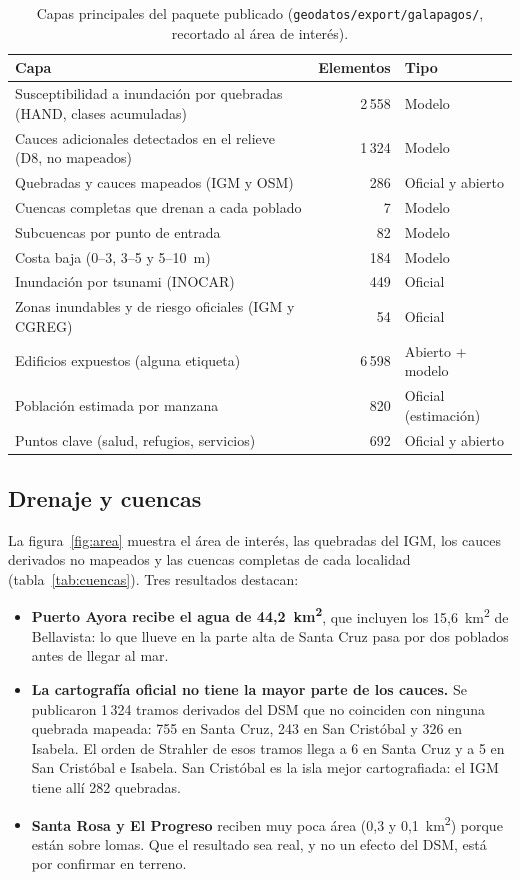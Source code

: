 \documentclass{sosg-informe}
\newcommand{\kmc}{km\textsuperscript{2}}
\begin{document}
\begin{table}[ht]
  \centering\small
  \caption{Capas principales del paquete publicado (\texttt{geodatos/export/galapagos/}, recortado al área de interés).}
  \label{tab:capas}
  \begin{tabularx}{\linewidth}{>{\raggedright\arraybackslash}Xrl}
    \toprule
    Capa & Elementos & Tipo \\
    \midrule
    Susceptibilidad a inundación por quebradas (HAND, clases acumuladas) & 2\,558 & Modelo \\
    Cauces adicionales detectados en el relieve (D8, no mapeados) & 1\,324 & Modelo \\
    Quebradas y cauces mapeados (IGM y OSM) & 286 & Oficial y abierto \\
    Cuencas completas que drenan a cada poblado & 7 & Modelo \\
    Subcuencas por punto de entrada & 82 & Modelo \\
    Costa baja (0--3, 3--5 y 5--10~m) & 184 & Modelo \\
    Inundación por tsunami (INOCAR) & 449 & Oficial \\
    Zonas inundables y de riesgo oficiales (IGM y CGREG) & 54 & Oficial \\
    Edificios expuestos (alguna etiqueta) & 6\,598 & Abierto + modelo \\
    Población estimada por manzana & 820 & Oficial (estimación) \\
    Puntos clave (salud, refugios, servicios) & 692 & Oficial y abierto \\
    \bottomrule
  \end{tabularx}
\end{table}

\subsection{Drenaje y cuencas}\label{sec:cuencas}
La figura~\ref{fig:area} muestra el área de interés, las quebradas del IGM, los cauces derivados no mapeados y las cuencas completas de cada localidad (tabla~\ref{tab:cuencas}). Tres resultados destacan:
\begin{itemize}
  \item \textbf{Puerto Ayora recibe el agua de 44,2~\kmc}, que incluyen los 15,6~\kmc{} de Bellavista: lo que llueve en la parte alta de Santa Cruz pasa por dos poblados antes de llegar al mar.
  \item \textbf{La cartografía oficial no tiene la mayor parte de los cauces.} Se publicaron 1\,324 tramos derivados del DSM que no coinciden con ninguna quebrada mapeada: 755 en Santa Cruz, 243 en San Cristóbal y 326 en Isabela. El orden de Strahler de esos tramos llega a 6 en Santa Cruz y a 5 en San Cristóbal e Isabela. San Cristóbal es la isla mejor cartografiada: el IGM tiene allí 282 quebradas.
  \item \textbf{Santa Rosa y El Progreso} reciben muy poca área (0,3 y 0,1~\kmc) porque están sobre lomas. Que el resultado sea real, y no un efecto del DSM, está por confirmar en terreno.
\end{itemize}
\end{document}
